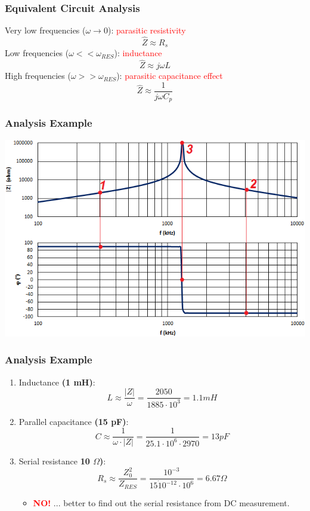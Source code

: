 \documentclass{beamer}
\begin{document}
	\begin{frame}
    \frametitle{Equivalent Circuit Analysis}
		Very low frequencies ($\omega \rightarrow 0$): \textcolor{red}{parasitic resistivity}
		$$\hat{Z}\approx R_s$$
		Low frequencies ($\omega << \omega_{RES}$): \textcolor{red}{inductance}
		$$\hat{Z}\approx j\omega L$$
		High frequencies ($\omega >> \omega_{RES}$): \textcolor{red}{parasitic capacitance effect}
		$$\hat{Z}\approx \frac{1}{j\omega C_p}$$
	\end{frame}
	\begin{frame}
    \frametitle{Analysis Example}
		
		\begin{center}
			\includegraphics[scale=0.6]{obr11_prikladL.png}
		\end{center}
	\end{frame}
	\begin{frame}
    \frametitle{Analysis Example}
		
		\begin{enumerate}
		\setcounter{enumi}{0}
			\item Inductance \textbf{(1 mH)}: $$L\approx \frac{\left|Z\right|}{\omega}= \frac{2050}{1885\cdot 10^3}= 1.1 mH$$
			\item Parallel capacitance \textbf{(15 pF)}: $$C\approx \frac{1}{\omega \cdot \left|Z\right|}= \frac{1}{25.1\cdot 10^6\cdot2970}= 13 pF$$
			\item Serial resistance \textbf{10 $\Omega$)}: $$R_s \approx \frac{Z_0^2}{Z_{RES}}=\frac{10^{-3}}{15\dot 10^{-12}\cdot 10^6}= 6.67 \Omega$$
			
			\begin{itemize}
				\item \large\textbf{\textcolor{red}{NO!}} \small... better to find out the serial resistance from DC measurement.
			\end{itemize}
		\end{enumerate}
	\end{frame}
\end{document}
